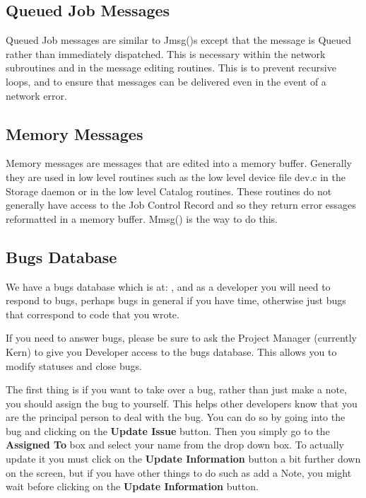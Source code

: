 \subsection{Queued Job Messages}
Queued Job messages are similar to Jmsg()s except that the message is
Queued rather than immediately dispatched. This is necessary within the
network subroutines and in the message editing routines. This is to prevent
recursive loops, and to ensure that messages can be delivered even in the
event of a network error.


\subsection{Memory Messages}

Memory messages are messages that are edited into a memory buffer. Generally
they are used in low level routines such as the low level device file dev.c in
the Storage daemon or in the low level Catalog routines. These routines do not
generally have access to the Job Control Record and so they return error
essages reformatted in a memory buffer. Mmsg() is the way to do this.

\subsection{Bugs Database}
We have a bugs database which is at:
, and as
a developer you will need to respond to bugs, perhaps bugs in general
if you have time, otherwise just bugs that correspond to code that
you wrote.

If you need to answer bugs, please be sure to ask the Project Manager
(currently Kern) to give you Developer access to the bugs database. This
allows you to modify statuses and close bugs.

The first thing is if you want to take over a bug, rather than just make a
note, you should assign the bug to yourself. This helps other developers
know that you are the principal person to deal with the bug.  You can do so
by going into the bug and clicking on the {\bf Update Issue} button. Then
you simply go to the {\bf Assigned To} box and select your name from the
drop down box.  To actually update it you must click on the {\bf Update
Information} button a bit further down on the screen, but if you have other
things to do such as add a Note, you might wait before clicking on the {\bf
Update Information} button.

